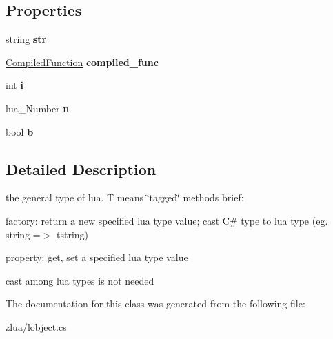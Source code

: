 \subsection*{Properties}
\begin{DoxyCompactItemize}
\item 
\mbox{\label{classzlua_1_1lua___t_value_a1b3b6cb5930ef892d5ec7fa8d3421b30}} 
string {\bfseries str}
\item 
\mbox{\label{classzlua_1_1lua___t_value_af86fc5ea154a68a65fef269dc28a5799}} 
\mbox{\hyperlink{classzlua_1_1_compiled_function}{Compiled\+Function}} {\bfseries compiled\+\_\+func}
\item 
\mbox{\label{classzlua_1_1lua___t_value_afaa893cd000573cc850bea3fbc51825a}} 
int {\bfseries i}
\item 
\mbox{\label{classzlua_1_1lua___t_value_aac7abef92780df48bf961a2ea54440d3}} 
lua\+\_\+\+Number {\bfseries n}
\item 
\mbox{\label{classzlua_1_1lua___t_value_a76fd6fe1760b731a9e9e0662384b2a0e}} 
bool {\bfseries b}
\end{DoxyCompactItemize}


\subsection{Detailed Description}
the general type of lua. T means \char`\"{}tagged\char`\"{} methods brief\+: 


\begin{DoxyEnumerate}
\item factory\+: return a new specified lua type value; cast C\# type to lua type (eg. string =$>$ tstring)
\item property\+: get, set a specified lua type value
\item cast among lua types is not needed 
\end{DoxyEnumerate}

The documentation for this class was generated from the following file\+:\begin{DoxyCompactItemize}
\item 
zlua/lobject.\+cs\end{DoxyCompactItemize}

